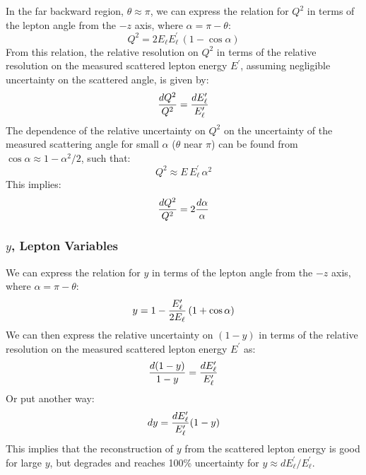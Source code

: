 \documentclass[12pt]{article}
\begin{document}
In the far backward region, $\theta \approx \pi$, we can express the relation for $Q^2$ in terms of the lepton angle from the $-z$ axis, where $\alpha = \pi - \theta$:
%
\begin{equation}
Q^2 = 2 E_\ell E^\prime_\ell\, (1- \cos \alpha)
\label{eq:Q2alpha}
\end{equation}
%
From this relation, the relative resolution on $Q^2$ in terms of the relative resolution on the measured scattered lepton energy $E^\prime$, assuming negligible uncertainty on the scattered angle, is given by:
%
\begin{equation}
  {dQ^2 \over Q^2} = {dE^\prime_{\ell} \over E^\prime_{\ell}}
\label{eq:dQ2Elep}
\end{equation}
%
The dependence of the relative uncertainty on $Q^2$ on the uncertainty of the measured scattering angle for small $\alpha$ ($\theta$ near $\pi$) can be found from $\cos\alpha \approx 1-\alpha^2/2$, such that:
%
\begin{equation}
Q^2 \approx E\,E^\prime_{\ell}\, \alpha^2
\end{equation}
This implies:
%
\begin{equation}
  {dQ^2 \over Q^2} = 2{d\alpha \over \alpha}
\label{eq:dQ2alpha}
\end{equation}
%

\subsubsection{$y$, Lepton Variables}

We can express the relation for $y$ in terms of the lepton angle from the $-z$ axis, where $\alpha = \pi - \theta$:
%
\begin{equation}
y = 1 - {E^\prime_\ell \over 2 E_\ell} \, (1+\cos\alpha)
\label{eq:Yalpha}
\end{equation}
%
We can then express the relative uncertainty on $(1-y)$ in terms of the relative resolution on the measured scattered lepton energy $E^\prime$ as:
%
\begin{equation}
{d(1-y) \over 1-y} = {dE^\prime_{\ell} \over E^\prime_{\ell}}
\end{equation}
%
Or put another way:
%
\begin{equation}
dy = {dE^\prime_{\ell} \over E^\prime_{\ell}}(1-y)
\end{equation}
%
This implies that the reconstruction of $y$ from the scattered lepton energy is good for large $y$, but degrades and reaches 100\% uncertainty for $y \approx dE^\prime_{\ell}/E^\prime_{\ell}$. 
\end{document}
